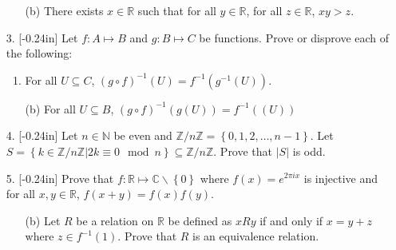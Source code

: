 \documentclass[letterpaper,12pt]{article}
\newcommand{\set}[1]{\left\{ #1 \right\}}
\theoremstyle{definition}
\begin{document}
\pagebreak
\begin{enumerate}
    \item[] \begin{enumerate}
        \item[(b)] There exists $x \in \mathbb{R}$ such that for all $y \in \mathbb{R}$, for all $z \in \mathbb{R}$, $xy > z$.
    \end{enumerate}
\end{enumerate}
\pagebreak
\begin{enumerate}
    \item[3. ]\reversemarginpar{}[-0.24in] Let $f: A \mapsto B$ and $g: B \mapsto C$ be functions. Prove or disprove each of the following: \begin{enumerate}
        \item For all $U \subseteq C$, $(g \circ f)^{-1} (U) = f^{-1}(g^{-1}(U))$.
        
    \end{enumerate}
\end{enumerate}
\pagebreak
\begin{enumerate}
    \item[] \begin{enumerate}
        \item[(b)] For all $U \subseteq B$, $(g\circ f)^{-1}(g(U)) = f^{-1}((U))$
    \end{enumerate}
\end{enumerate}
\pagebreak
\begin{enumerate}
    \item[4.]\reversemarginpar{}[-0.24in] Let $n \in \mathbb{N}$ be even and $\mathbb{Z} / n\mathbb{Z} = \set{0,1,2,\ldots,n-1}$. Let $S = \set{k \in \mathbb{Z} / n\mathbb{Z}| 2k \equiv 0 \mod n } \subseteq \mathbb{Z} / n\mathbb{Z}$. Prove that $|S|$ is odd.
\end{enumerate}
\pagebreak
\begin{enumerate}
    \item[5.]  \reversemarginpar{}[-0.24in] Prove that $f: \mathbb{R} \mapsto \mathbb{C}\backslash \set{0}$ where $f(x) = e^{2\pi i x}$ is injective and for all $x,y \in \mathbb{R}$, $f(x+y) = f(x)f(y)$.
\end{enumerate}
\pagebreak
\begin{enumerate}
    \item[] \begin{enumerate}
        \item[(b)] Let $R$ be a relation on $\mathbb{R}$ be defined as $x R y$ if and only if $x = y + z$ where $z \in f^{-1}(1)$. Prove that $R$ is an equivalence relation.
    \end{enumerate}
\end{enumerate}
\end{document}
